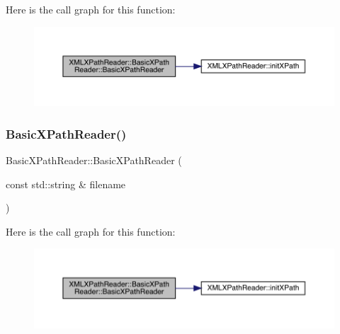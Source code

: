 Here is the call graph for this function\+:\nopagebreak
\begin{figure}[H]
\begin{center}
\leavevmode
\includegraphics[width=350pt]{d6/dbf/classXMLXPathReader_1_1BasicXPathReader_ae50fd4b786cbc875ba1ca6e04a62815f_cgraph}
\end{center}
\end{figure}
\mbox{\label{classXMLXPathReader_1_1BasicXPathReader_ad8df69bf440f9a9602fcba52782489f0}} 
\subsubsection{\texorpdfstring{BasicXPathReader()}{BasicXPathReader()}\hspace{0.1cm}{\footnotesize\ttfamily [3/12]}}
{\footnotesize\ttfamily Basic\+X\+Path\+Reader\+::\+Basic\+X\+Path\+Reader (\begin{DoxyParamCaption}\item[{const std\+::string \&}]{filename }\end{DoxyParamCaption})}

Here is the call graph for this function\+:\nopagebreak
\begin{figure}[H]
\begin{center}
\leavevmode
\includegraphics[width=350pt]{d6/dbf/classXMLXPathReader_1_1BasicXPathReader_ad8df69bf440f9a9602fcba52782489f0_cgraph}
\end{center}
\end{figure}
\mbox{\label{classXMLXPathReader_1_1BasicXPathReader_ad741466e0f48892e36f19472db5abf52}} 
